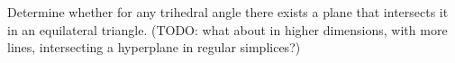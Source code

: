 Determine whether for any trihedral angle there exists a plane that intersects it in an equilateral triangle.
\newline (TODO: what about in higher dimensions, with more lines, intersecting a hyperplane in regular simplices?)
